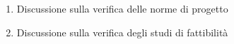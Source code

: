 \begin{enumerate}
    \item Discussione sulla verifica delle norme di progetto
    \item Discussione sulla verifica degli studi di fattibilità
\end{enumerate}